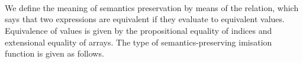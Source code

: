 \begin{code}%
%
\>[2]\AgdaSpace{}%
\AgdaSpace{}%
\AgdaSymbol{(}\AgdaSpace{}%
\AgdaSymbol{:}\AgdaSpace{}%
\AgdaSymbol{)}\AgdaSpace{}%
\AgdaSymbol{:}\AgdaSpace{}%
\AgdaSpace{}%
\<%
\\
\>[2][@{}l@{\AgdaIndent{0}}]%
\>[4]\AgdaSpace{}%
\AgdaSpace{}%
\AgdaSymbol{;}\AgdaSpace{}%
\<%
\\
\>[4][@{}l@{\AgdaIndent{0}}]%
\>[6]\AgdaSpace{}%
\AgdaSymbol{:}\AgdaSpace{}%
\AgdaSpace{}%
\AgdaSymbol{\{}\AgdaSymbol{\}}\AgdaSpace{}%
\AgdaSpace{}%
\AgdaSpace{}%
\AgdaSpace{}%
\AgdaOperator{\AgdaFunction{+}}\AgdaSpace{}%
%
\>[37]\AgdaSpace{}%
\AgdaSymbol{;}%
\>[43]\AgdaSpace{}%
\AgdaSymbol{:}\AgdaSpace{}%
\AgdaSpace{}%
\AgdaSymbol{\{}\AgdaSymbol{\}}\AgdaSpace{}%
\AgdaSpace{}%
\AgdaSpace{}%
\AgdaOperator{\AgdaFunction{+}}\AgdaSpace{}%
\AgdaSpace{}%
%
\>[74]\AgdaSpace{}%
\<%
\\
%
\>[6]\AgdaSpace{}%
\AgdaSymbol{:}\AgdaSpace{}%
\AgdaSpace{}%
\AgdaSymbol{\{}\AgdaSymbol{\}}\AgdaSpace{}%
\AgdaSpace{}%
\AgdaSpace{}%
\AgdaSpace{}%
\AgdaOperator{\AgdaFunction{*}}\AgdaSpace{}%
%
\>[37]\AgdaSpace{}%
\AgdaSymbol{;}%
\>[43]\AgdaSpace{}%
\AgdaSymbol{:}\AgdaSpace{}%
\AgdaSpace{}%
\AgdaSymbol{\{}\AgdaSymbol{\}}\AgdaSpace{}%
\AgdaSpace{}%
\AgdaSpace{}%
\AgdaOperator{\AgdaFunction{*}}\AgdaSpace{}%
\AgdaSpace{}%
%
\>[74]\AgdaSpace{}%
\<%
\end{code}
We define the meaning of semantics preservation by means of the 
relation, which says that two expressions are equivalent if they evaluate
to equivalent values.  Equivalence of values is given by the propositional
equality of indices and extensional equality of arrays.  The type of
semantics-preserving imisation function is given as follows.
\begin{code}[hide]%
%
\>[2]\<%
\\
\>[2][@{}l@{\AgdaIndent{0}}]%
\>[4]\AgdaSpace{}%
\AgdaSymbol{:}\AgdaSpace{}%
\<%
\\
%
\\[\AgdaEmptyExtraSkip]%
%
\>[2]\AgdaSpace{}%
\AgdaSpace{}%
\<%
\end{code}
